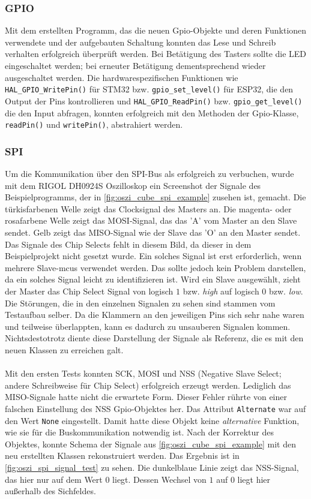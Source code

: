 \subsubsection{GPIO}
Mit dem erstellten Programm, das die neuen Gpio-Objekte und deren Funktionen verwendete und der aufgebauten Schaltung konnten das Lese und Schreib verhalten erfolgreich überprüft werden.
Bei Betätigung des Tasters sollte die LED eingeschaltet werden; bei erneuter Betätigung dementsprechend wieder ausgeschaltet werden.
Die hardwarespezifischen Funktionen wie \texttt{HAL\_GPIO\_WritePin()} für STM32 bzw. \texttt{gpio\_set\_level()} für ESP32, die den Output der Pins kontrollieren und \texttt{HAL\_GPIO\_ReadPin()} bzw. \texttt{gpio\_get\_level()} die den Input abfragen,  konnten erfolgreich mit den Methoden der Gpio-Klasse, \texttt{readPin()} und \texttt{writePin()}, abstrahiert werden.

\subsubsection{SPI}
Um die Kommunikation über den SPI-Bus als erfolgreich zu verbuchen, wurde mit dem RIGOL DH0924S Oszilloskop \cite{rigol_dho900} ein Screenshot der Signale des Beispielprogramms, der in \cref{fig:oszi_cube_spi_example} zusehen ist, gemacht.
Die türkisfarbenen Welle zeigt das Clocksignal des Masters an.
Die magenta- oder rosafarbene Welle zeigt das MOSI-Signal, das das 'A' vom Master an den Slave sendet.
Gelb zeigt das MISO-Signal wie der Slave das 'O' an den Master sendet.
Das Signale des Chip Selects fehlt in diesem Bild, da dieser in dem Beispielprojekt nicht gesetzt wurde.
Ein solches Signal ist erst erforderlich, wenn mehrere Slave-\gls{mcu}s verwendet werden.
Das sollte jedoch kein Problem darstellen, da ein solches Signal leicht zu identifizieren ist.
Wird ein Slave ausgewählt, zieht der Master das Chip Select Signal von logisch $1$ bzw. \textit{high} auf logisch $0$ bzw. \textit{low}. 
Die Störungen, die in den einzelnen Signalen zu sehen sind stammen vom Testaufbau selber.
Da die Klammern an den jeweiligen Pins sich sehr nahe waren und teilweise überlappten, kann es dadurch zu unsauberen Signalen kommen.
Nichtsdestotrotz diente diese Darstellung der Signale als Referenz, die es mit den neuen Klassen zu erreichen galt.
\\
\\
Mit den ersten Tests konnten SCK, MOSI und NSS (Negative Slave Select; andere Schreibweise für Chip Select) erfolgreich erzeugt werden.
Lediglich das MISO-Signale hatte nicht die erwartete Form.
Dieser Fehler rührte von einer falschen Einstellung des NSS Gpio-Objektes her.
Das Attribut \texttt{Alternate} war auf den Wert \texttt{None} eingestellt.
Damit hatte diese Objekt keine \textit{alternative} Funktion, wie sie für die Buskommunikation notwendig ist.
Nach der Korrektur des Objektes, konnte Schema der Signale aus \cref{fig:oszi_cube_spi_example} mit den neu erstellten Klassen rekonstruiert werden.
Das Ergebnis ist in \cref{fig:oszi_spi_signal_test} zu sehen.
Die dunkelblaue Linie zeigt das NSS-Signal, das hier nur auf dem Wert $0$ liegt.
Dessen Wechsel von $1$ auf $0$ liegt hier außerhalb des Sichfeldes.

